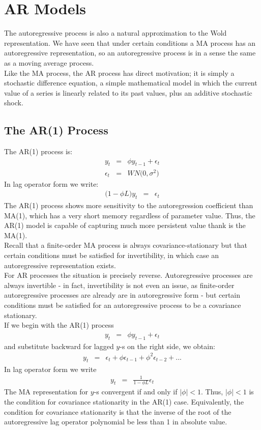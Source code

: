 \chapter{AR Models}
The autoregressive process is also a natural approximation to the Wold representation. We have seen that under certain conditions a MA process has an autoregressive representation, so an autoregressive process is in a sense the same as a moving average process.\\
Like the MA process, the AR process has direct motivation; it is simply a stochastic difference equation, a simple mathematical model in which the current value of a series is linearly related to its past values, plus an additive stochastic shock.

\section{The AR(1) Process}
The AR(1) process is:
\begin{eqnarray}
y_{t} &=& \phi y_{t - 1} + \epsilon_{t}\\
\epsilon_{t} &=& WN\big(0, \sigma^{2}\big)
\end{eqnarray}
In lag operator form we write:
\begin{eqnarray}
	\big(1 - \phi L\big)y_{t} &=& \epsilon_{t}
\end{eqnarray}
The AR(1) process shows more sensitivity to the autoregression coefficient than MA(1), which has a very short memory regardless of parameter value. Thus, the AR(1) model is capable of capturing much more persistent value thank is the MA(1).\\
Recall that a finite-order MA process is always covariance-stationary but that certain conditions must be satisfied for invertibility, in which case an autoregressive representation exists.\\
For AR processes the situation is precisely reverse. Autoregressive processes are always invertible - in fact, invertibility is not even an issue, as finite-order autoregressive processes are already are in autoregressive form - but certain conditions must be satisfied for an autoregressive process to be a covariance stationary.\\
If we begin with the AR(1) process
\begin{eqnarray}
	y_{t} &=& \phi y_{t - 1} + \epsilon_{t}
\end{eqnarray}
and substitute backward for lagged $y$-s on the right side, we obtain:
\begin{eqnarray}
	y_{t} &=& \epsilon_{t} + \phi \epsilon_{t - 1} + \phi^{2}\epsilon_{t - 2} + ...
\end{eqnarray}
In lag operator form we write
\begin{eqnarray}
	y_{t} &=& \frac{1}{1 - \phi L}\epsilon_{t}
\end{eqnarray}
The MA representation for $y$-s convergent if and only if $\vert\phi\vert < 1$. Thus, $\vert\phi\vert < 1$ is the condition for covariance stationarity in the AR(1) case. Equivalently, the condition for covariance stationarity is that the inverse of the root of the autoregressive lag operator polynomial be less than 1 in absolute value.

